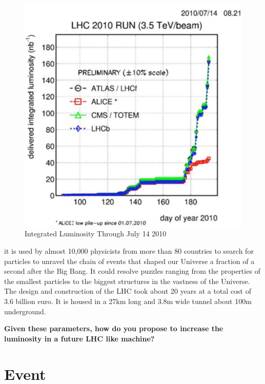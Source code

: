 \;
\;

\begin{figure}[h]
\centering\includegraphics[scale=0.7]{./Particleaccelerators/Pictures/fig4.pdf}
\caption{Integrated Luminosity Through July 14 2010}
\label{fig:pdgdedx}
\end{figure}

\;
\;

\noindent
it is used by almost 10,000 physicists from more than 80 countries to search for particles to unravel the chain of events that shaped our Universe a fraction of a second after the Big Bang. It could resolve puzzles ranging from the properties of the smallest particles to the biggest structures in the vastness of the Universe. The design and construction of the LHC took about 20 years at a total cost of  3.6 billion euro. It is housed in a 27km long and 3.8m wide tunnel about 100m underground.

\;
\;

\noindent
\textbf{Given these parameters, how do you propose to increase the luminosity in a future LHC like machine?}

\;
\;

\section{Event}

